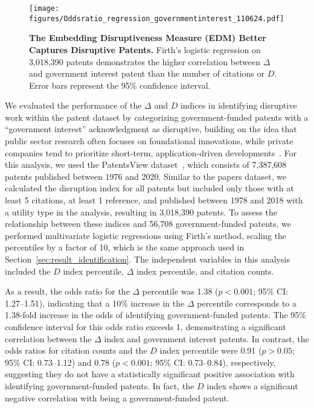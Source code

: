 \documentclass[12pt]{article}
\begin{document}
\begin{refsection}
\begin{figure}
    \centering
    \texttt{[image: figures/Oddsratio\_regression\_governmentinterest\_110624.pdf]}
    \caption{\textbf{The Embedding Disruptiveness Measure (EDM) Better Captures Disruptive Patents.} Firth's logistic regression on 3,018,390 patents demonstrates the higher correlation between $\Delta$ and government interest patent than the number of citations or $D$. Error bars represent the 95\% confidence interval. } 
    \label{fig:patent}
\end{figure}



We evaluated the performance of the $\Delta$ and $D$ indices in identifying disruptive work within the patent dataset by categorizing government-funded patents with a ``government interest'' acknowledgment as disruptive, building on the idea that public sector research often focuses on foundational innovations, while private companies tend to prioritize short-term, application-driven developments~\cite{partha1994toward,li2017applied,fleming2019government}. For this analysis, we used the PatentsView dataset~\cite{uspto_patentsview}, which consists of 7,387,608 patents published between 1976 and 2020. Similar to the papers dataset, we calculated the disruption index for all patents but included only those with at least 5 citations, at least 1 reference, and published between 1978 and 2018 with a utility type in the analysis, resulting in 3,018,390 patents. To assess the relationship between these indices and 56,708 government-funded patents, we performed multivariate logistic regressions using Firth's method, scaling the percentiles by a factor of 10, which is the same approach used in Section~\ref{sec:result_identification}. The independent variables in this analysis included the $D$ index percentile, $\Delta$ index percentile, and citation counts.

As a result, the odds ratio for the $\Delta$ percentile was 1.38 ($p<0.001$; 95\% CI: 1.27–1.51), indicating that a 10\% increase in the $\Delta$ percentile corresponds to a 1.38-fold increase in the odds of identifying government-funded patents. The 95\% confidence interval for this odds ratio exceeds 1, demonstrating a significant correlation between the $\Delta$ index and government interest patents. In contrast, the odds ratios for citation counts and the $D$ index percentile were 0.91 ($p>0.05$; 95\% CI: 0.73–1.12) and 0.78 ($p<0.001$; 95\% CI: 0.73–0.84), respectively, suggesting they do not have a statistically significant positive association with identifying government-funded patents. In fact, the $D$ index shows a significant negative correlation with being a government-funded patent.  


\end{refsection}
\end{document}
